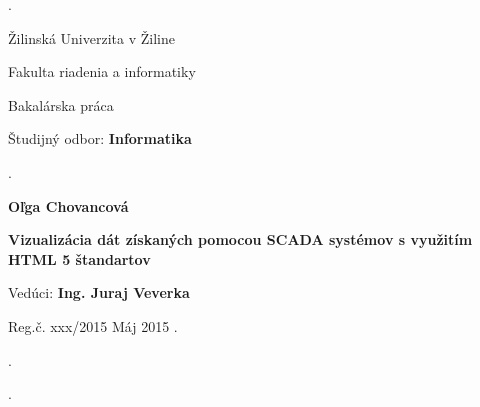 \begin{titlepage}
\phantom.

\bigskip

\begin{center}
{\sc\LARGE Žilinská Univerzita v Žiline}
\medskip

{\sc\Large Fakulta riadenia a informatiky}

\vfill\vfill\vfill\vfill

{\sc\LARGE Bakalárska práca}

\medskip

{\large Študijný odbor: {\bf Informatika}}
\end{center}


\vfill\vfill\vfill\vfill


\phantom.\hfill
\begin{minipage}{10cm}
\begin{center}
{\large\bf Oľga Chovancová}

\medskip

{\large\bf Vizualizácia dát získaných pomocou SCADA systémov s využitím HTML 5 štandartov}

\medskip

Vedúci: {\bf Ing. Juraj Veverka}

\medskip
 
\hfill
Reg.č. xxx/2015 
\hfill
Máj 2015
\hfill\phantom.
\end{center}
\end{minipage}
\hspace{1.7cm}\phantom.

\vspace{2.9cm}

\phantom.
\end{titlepage}




